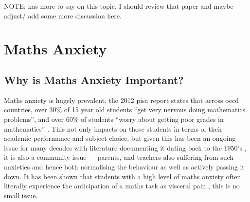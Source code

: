 \documentclass[twoside,12pt,a4paper]{report}
\begin{document}
NOTE: \cite{King2015} has more to say on this topic, I should review that paper and maybe adjust/ add some more discussion here.






\section{Maths Anxiety}


\subsection*{Why is Maths Anxiety Important?}

Maths anxiety is hugely prevalent, the 2012 \gls{pisa} report states that across \gls{oecd} countries, over 30\% of 15 year old students ``get very nervous doing mathematics problems'', and over 60\% of students ``worry about getting poor grades in mathematics''  \cite{PISA2013}. This not only impacts on those students in terms of their academic performance and subject choice, but given this has been an ongoing issue for many decades with literature documenting it dating back to the 1950's \cite{Dreger1957}, it is also a community issue --- parents, and teachers also suffering from such anxieties and hence both normalising the behaviour as well as actively passing it down. It has been shown that students with a high level of maths anxiety often literally experience the anticipation of a maths task as visceral pain \cite{Lyons2012pain}, this is no small issue.
\end{document}
